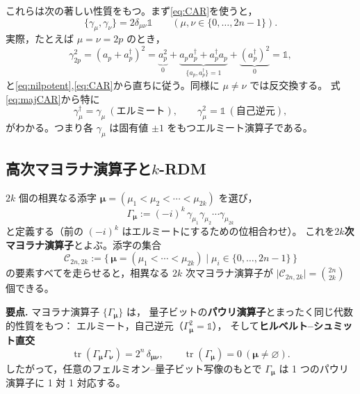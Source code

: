 \documentclass[11pt,a4paper]{ltjsarticle}
\newcommand{\tr}{\operatorname{tr}}
\newcommand{\ad}{a^\dagger}
\newcommand{\Id}{\mathbb{1}}
\newcommand{\Cc}{\mathcal{C}}
\theoremstyle{definition}
\theoremstyle{plain}
\begin{document}
これらは次の著しい性質をもつ。まず\eqref{eq:CAR}を使うと，
\begin{equation}
  \{\gamma_\mu,\gamma_\nu\}=2\delta_{\mu\nu}\Id
  \qquad(\mu,\nu\in\{0,\dots,2n-1\}).
  \label{eq:majCAR}
\end{equation}
実際，たとえば $\mu=\nu=2p$ のとき，
\[
  \gamma_{2p}^2=(a_p+\ad_p)^2
  =\underbrace{a_p^2}_{0}+\underbrace{a_p\ad_p+\ad_p a_p}_{\{a_p,\ad_p\}=1}
   +\underbrace{(\ad_p)^2}_{0}=\Id ,
\]
と\eqref{eq:nilpotent},\eqref{eq:CAR}から直ちに従う。同様に $\mu\ne\nu$ では反交換する。
式\eqref{eq:majCAR}から特に
\begin{equation}
  \gamma_\mu^\dagger=\gamma_\mu\ (\text{エルミート}),\qquad
  \gamma_\mu^2=\Id\ (\text{自己逆元}),
\end{equation}
がわかる。つまり各 $\gamma_\mu$ は固有値 $\pm1$ をもつエルミート演算子である。

\subsection{高次マヨラナ演算子と$k$-RDM}
$2k$ 個の相異なる添字 $\bm\mu=(\mu_1<\mu_2<\cdots<\mu_{2k})$ を選び，
\begin{equation}
  \Gamma_{\bm\mu}:=(-i)^{k}\,\gamma_{\mu_1}\gamma_{\mu_2}\cdots\gamma_{\mu_{2k}}
  \label{eq:Gammadef}
\end{equation}
と定義する（前の $(-i)^k$ はエルミートにするための位相合わせ）。
これを\textbf{$2k$次マヨラナ演算子}とよぶ。添字の集合
\[
  \Cc_{2n,2k}:=\{\,\bm\mu=(\mu_1<\cdots<\mu_{2k})\mid \mu_i\in\{0,\dots,2n-1\}\,\}
\]
の要素すべてを走らせると，相異なる $2k$ 次マヨラナ演算子が
$\bigl|\Cc_{2n,2k}\bigr|=\binom{2n}{2k}$ 個できる。

\begin{keybox}
\textbf{要点.}\; マヨラナ演算子 $\{\Gamma_{\bm\mu}\}$ は，
量子ビットの\textbf{パウリ演算子}とまったく同じ代数的性質をもつ：
エルミート，自己逆元（$\Gamma_{\bm\mu}^2=\Id$），
そして\textbf{ヒルベルト--シュミット直交}
\begin{equation}
  \tr(\Gamma_{\bm\mu}\Gamma_{\bm\nu})=2^{n}\,\delta_{\bm\mu\bm\nu},\qquad
  \tr(\Gamma_{\bm\mu})=0\ (\bm\mu\neq\varnothing).
  \label{eq:HSorth}
\end{equation}
したがって，任意のフェルミオン--量子ビット写像のもとで
$\Gamma_{\bm\mu}$ は 1 つのパウリ演算子に 1 対 1 対応する。
\end{keybox}
\end{document}
